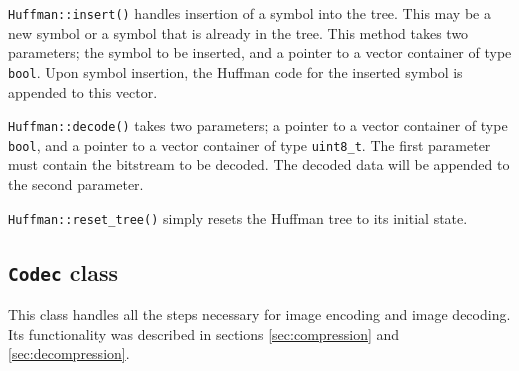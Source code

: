 \documentclass[pdftex, 11pt, a4paper, titlepage]{article}
\newcommand{\code}{\texttt}
\begin{document}
    \code{Huffman::insert()} handles insertion of a symbol into the tree. This may be a new symbol or
    a symbol that is already in the tree. This method takes two parameters; the symbol to be inserted,
    and a pointer to a vector container of type \code{bool}. Upon symbol insertion, the Huffman code for
    the inserted symbol is appended to this vector.

    \code{Huffman::decode()} takes two parameters; a pointer to a vector container of type \code{bool},
    and a pointer to a vector container of type \code{uint8\_t}. The first parameter must contain the
    bitstream to be decoded. The decoded data will be appended to the second parameter.

    \code{Huffman::reset\_tree()} simply resets the Huffman tree to its initial state.

    \subsection{\code{Codec} class}
    This class handles all the steps necessary for image encoding and image decoding. Its functionality
    was described in sections \ref{sec:compression} and \ref{sec:decompression}.
\end{document}

